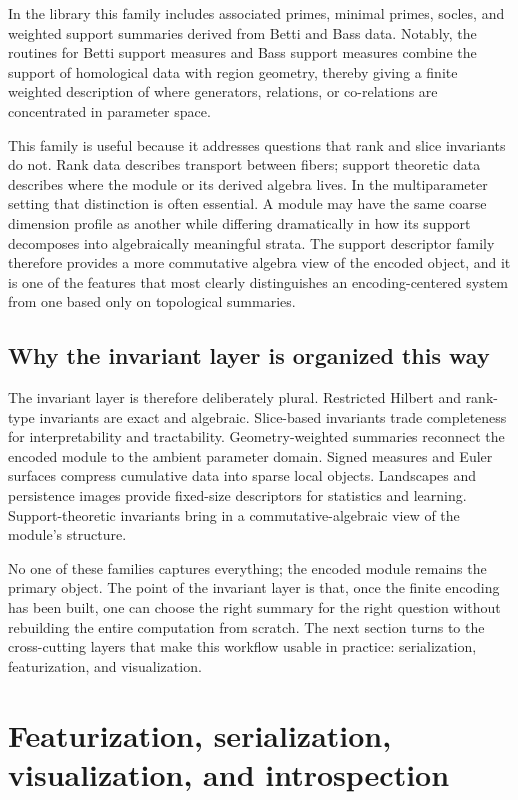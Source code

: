 \documentclass[11pt]{article}
\theoremstyle{definition}
\theoremstyle{remark}
\begin{document}
In the library this family includes associated primes, minimal primes, socles, and weighted support summaries derived from Betti and Bass data.  Notably, the routines for Betti support measures and Bass support measures combine the support of homological data with region geometry, thereby giving a finite weighted description of where generators, relations, or co-relations are concentrated in parameter space.

This family is useful because it addresses questions that rank and slice invariants do not.  Rank data describes transport between fibers; support theoretic data describes where the module or its derived algebra lives.  In the multiparameter setting that distinction is often essential.  A module may have the same coarse dimension profile as another while differing dramatically in how its support decomposes into algebraically meaningful strata.  The support descriptor family therefore provides a more commutative algebra view of the encoded object, and it is one of the features that most clearly distinguishes an encoding-centered system from one based only on topological summaries.

\subsection{Why the invariant layer is organized this way}

The invariant layer is therefore deliberately plural.  Restricted Hilbert and rank-type invariants are exact and algebraic.  Slice-based invariants trade completeness for interpretability and tractability.  Geometry-weighted summaries reconnect the encoded module to the ambient parameter domain.  Signed measures and Euler surfaces compress cumulative data into sparse local objects.  Landscapes and persistence images provide fixed-size descriptors for statistics and learning.  Support-theoretic invariants bring in a commutative-algebraic view of the module's structure.

No one of these families captures everything; the encoded module remains the primary object.  The point of the invariant layer is that, once the finite encoding has been built, one can choose the right summary for the right question without rebuilding the entire computation from scratch.  The next section turns to the cross-cutting layers that make this workflow usable in practice: serialization, featurization, and visualization.

\section{Featurization, serialization, visualization, and introspection}\label{sec:cross-cutting}
\end{document}
